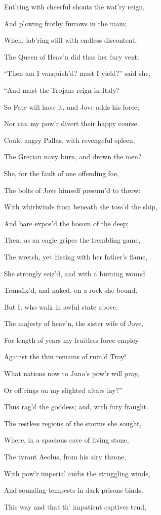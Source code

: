 Ent’ring with cheerful shouts the wat’ry reign,

And plowing frothy furrows in the main;

When, lab’ring still with endless discontent,

The Queen of Heav’n did thus her fury vent:

“Then am I vanquish’d? must I yield?” said she,

“And must the Trojans reign in Italy?

So Fate will have it, and Jove adds his force;

Nor can my pow’r divert their happy course.

Could angry Pallas, with revengeful spleen,

The Grecian navy burn, and drown the men?

She, for the fault of one offending foe,

The bolts of Jove himself presum’d to throw:

With whirlwinds from beneath she toss’d the ship,

And bare expos’d the bosom of the deep;

Then, as an eagle gripes the trembling game,

The wretch, yet hissing with her father’s flame,

She strongly seiz’d, and with a burning wound

Transfix’d, and naked, on a rock she bound.

But I, who walk in awful state above,

The majesty of heav’n, the sister wife of Jove,

For length of years my fruitless force employ

Against the thin remains of ruin’d Troy!

What nations now to Juno’s pow’r will pray,

Or off’rings on my slighted altars lay?”

Thus rag’d the goddess; and, with fury fraught.

The restless regions of the storms she sought,

Where, in a spacious cave of living stone,

The tyrant Aeolus, from his airy throne,

With pow’r imperial curbs the struggling winds,

And sounding tempests in dark prisons binds.

This way and that th’ impatient captives tend,

